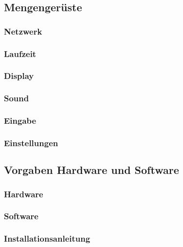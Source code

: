 \subsection{Mengengerüste}
    \subsubsection{Netzwerk}
    
    \subsubsection{Laufzeit}
    
    \subsubsection{Display}
    
    \subsubsection{Sound}
    
    \subsubsection{Eingabe}
    
    \subsubsection{Einstellungen}
    
\clearpage
\subsection{Vorgaben Hardware und Software}
    \subsubsection{Hardware}
    
    \subsubsection{Software}
    
    \subsubsection{Installationsanleitung}
    
    